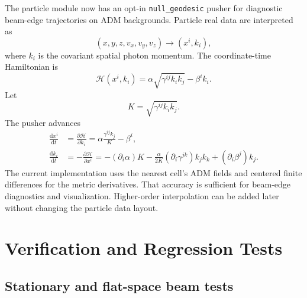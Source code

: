 \documentclass[11pt]{article}
\newcommand{\dd}{\mathrm{d}}
\newcommand{\code}[1]{\texttt{#1}}
\begin{document}
The particle module now has an opt-in \code{null\_geodesic} pusher for
diagnostic beam-edge trajectories on ADM backgrounds.  Particle real data are
interpreted as
\begin{equation}
  (x,y,z,v_x,v_y,v_z) \longrightarrow (x^i,k_i),
\end{equation}
where \(k_i\) is the covariant spatial photon momentum.  The coordinate-time
Hamiltonian is
\begin{equation}
  \mathcal{H}(x^i,k_i)=\alpha\sqrt{\gamma^{ij}k_i k_j}-\beta^ik_i .
  \label{eq:null_hamiltonian}
\end{equation}
Let
\begin{equation}
  K=\sqrt{\gamma^{ij}k_i k_j}.
\end{equation}
The pusher advances
\begin{align}
  \frac{\dd x^i}{\dd t}
    &= \frac{\partial\mathcal{H}}{\partial k_i}
     = \alpha\frac{\gamma^{ij}k_j}{K}-\beta^i,
     \label{eq:null_x}\\
  \frac{\dd k_i}{\dd t}
    &= -\frac{\partial\mathcal{H}}{\partial x^i}
     = -(\partial_i\alpha)K
       -\frac{\alpha}{2K}(\partial_i\gamma^{jk})k_jk_k
       +(\partial_i\beta^j)k_j .
     \label{eq:null_k}
\end{align}
The current implementation uses the nearest cell's ADM fields and centered
finite differences for the metric derivatives.  That accuracy is sufficient for
beam-edge diagnostics and visualization.  Higher-order interpolation can be
added later without changing the particle data layout.

\section{Verification and Regression Tests}
\label{sec:tests}

\subsection{Stationary and flat-space beam tests}
\end{document}
